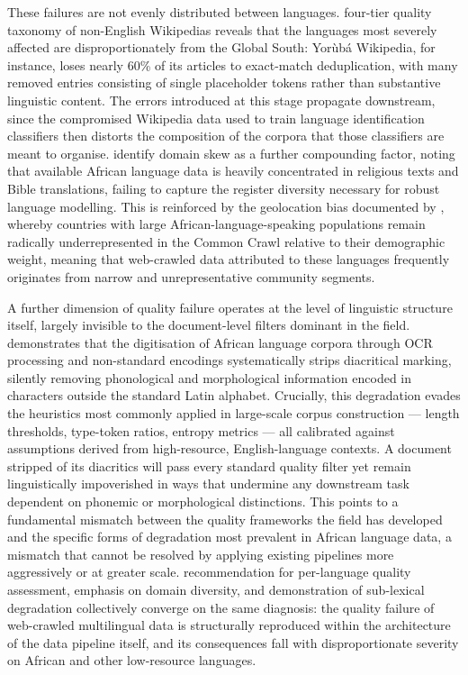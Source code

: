 \documentclass[12pt]{ThesisRU}
\begin{document}
These failures are not evenly distributed between languages. \citet{tatariya2024good} four-tier quality taxonomy of non-English Wikipedias reveals that the languages most severely affected are disproportionately from the Global South: Yorùbá Wikipedia, for instance, loses nearly 60\% of its articles to exact-match deduplication, with many removed entries consisting of single placeholder tokens rather than substantive linguistic content. The errors introduced at this stage propagate downstream, since the compromised Wikipedia data used to train language identification classifiers then distorts the composition of the corpora that those classifiers are meant to organise. \citet{kwon2026afroscope} identify domain skew as a further compounding factor, noting that available African language data is heavily concentrated in religious texts and Bible translations, failing to capture the register diversity necessary for robust language modelling. This is reinforced by the geolocation bias documented by \citet{perelkiewicz2024review}, whereby countries with large African-language-speaking populations remain radically underrepresented in the Common Crawl relative to their demographic weight, meaning that web-crawled data attributed to these languages frequently originates from narrow and unrepresentative community segments.

A further dimension of quality failure operates at the level of linguistic structure itself, largely invisible to the document-level filters dominant in the field. \citet{de2007automatic} demonstrates that the digitisation of African language corpora through OCR processing and non-standard encodings systematically strips diacritical marking, silently removing phonological and morphological information encoded in characters outside the standard Latin alphabet. Crucially, this degradation evades the heuristics most commonly applied in large-scale corpus construction — length thresholds, type-token ratios, entropy metrics — all calibrated against assumptions derived from high-resource, English-language contexts. A document stripped of its diacritics will pass every standard quality filter yet remain linguistically impoverished in ways that undermine any downstream task dependent on phonemic or morphological distinctions. This points to a fundamental mismatch between the quality frameworks the field has developed and the specific forms of degradation most prevalent in African language data, a mismatch that cannot be resolved by applying existing pipelines more aggressively or at greater scale. \citet{tatariya2024good} recommendation for per-language quality assessment, \citet{kwon2026afroscope} emphasis on domain diversity, and \citet{de2007automatic} demonstration of sub-lexical degradation collectively converge on the same diagnosis: the quality failure of web-crawled multilingual data is structurally reproduced within the architecture of the data pipeline itself, and its consequences fall with disproportionate severity on African and other low-resource languages.
\end{document}
